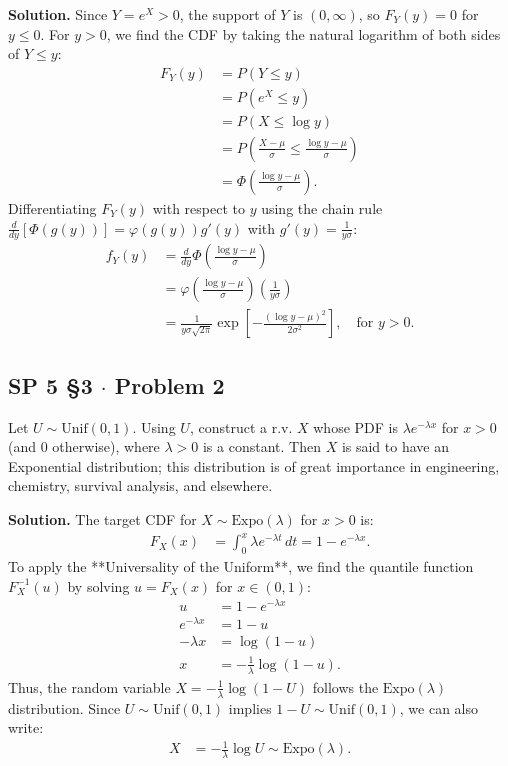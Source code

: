 \documentclass[11pt,a4paper]{article}
\begin{document}
\noindent \textbf{Solution.} Since $Y = e^X > 0$, the support of $Y$ is $(0, \infty)$, so $F_Y(y) = 0$ for $y \le 0$. For $y > 0$, we find the CDF by taking the natural logarithm of both sides of $Y \le y$:
\begin{align*}
F_Y(y) &= P(Y \le y) \\
&= P(e^X \le y) \\
&= P(X \le \log y) \\
&= P\left( \frac{X - \mu}{\sigma} \le \frac{\log y - \mu}{\sigma} \right) \\
&= \Phi\left( \frac{\log y - \mu}{\sigma} \right).
\end{align*}
Differentiating $F_Y(y)$ with respect to $y$ using the chain rule $\frac{d}{dy}[\Phi(g(y))] = \varphi(g(y)) g'(y)$ with $g'(y) = \frac{1}{y\sigma}$:
\begin{align*}
f_Y(y) &= \frac{d}{dy} \Phi\left( \frac{\log y - \mu}{\sigma} \right) \\
&= \varphi\left( \frac{\log y - \mu}{\sigma} \right) \left( \frac{1}{y\sigma} \right) \\
&= \frac{1}{y \sigma \sqrt{2\pi}} \exp\left[ -\frac{(\log y - \mu)^2}{2\sigma^2} \right], \quad \text{for } y > 0.
\end{align*}

\vspace{10pt}
\subsection{SP 5 \S3 $\cdot$ Problem 2}
\begin{tcolorbox}[title={SP 5 \S3 $\cdot$ Problem 2}]
Let $U \sim \text{Unif}(0, 1)$. Using $U$, construct a r.v. $X$ whose PDF is $\lambda e^{-\lambda x}$ for $x > 0$ (and 0 otherwise), where $\lambda > 0$ is a constant. Then $X$ is said to have an Exponential distribution; this distribution is of great importance in engineering, chemistry, survival analysis, and elsewhere.
\end{tcolorbox}

\noindent \textbf{Solution.} The target CDF for $X \sim \text{Expo}(\lambda)$ for $x > 0$ is:
\begin{align*}
F_X(x) &= \int_{0}^{x} \lambda e^{-\lambda t} \, dt = 1 - e^{-\lambda x}.
\end{align*}
To apply the **Universality of the Uniform**, we find the quantile function $F_X^{-1}(u)$ by solving $u = F_X(x)$ for $x \in (0, 1)$:
\begin{align*}
u &= 1 - e^{-\lambda x} \\
e^{-\lambda x} &= 1 - u \\
-\lambda x &= \log(1 - u) \\
x &= -\frac{1}{\lambda} \log(1 - u).
\end{align*}
Thus, the random variable $X = -\frac{1}{\lambda} \log(1 - U)$ follows the $\text{Expo}(\lambda)$ distribution. Since $U \sim \text{Unif}(0, 1)$ implies $1 - U \sim \text{Unif}(0, 1)$, we can also write:
\begin{align*}
X &= -\frac{1}{\lambda} \log U \sim \text{Expo}(\lambda).
\end{align*}
\end{document}
